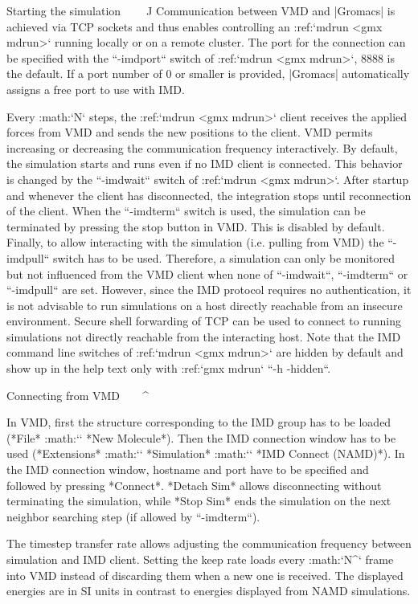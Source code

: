 Starting the simulation
^^^^^^^^^^^^^^^^^^^^^^^

Communication between VMD and |Gromacs| is achieved via TCP sockets and
thus enables controlling an :ref:`mdrun <gmx mdrun>` running locally or on
a remote cluster. The port for the connection can be specified with the
``-imdport`` switch of :ref:`mdrun <gmx mdrun>`, 8888 is the
default. If a port number of 0 or smaller is provided, |Gromacs|
automatically assigns a free port to use with IMD.

Every :math:`N` steps, the :ref:`mdrun <gmx mdrun>` client receives the
applied forces from VMD and sends the new positions to the client. VMD
permits increasing or decreasing the communication frequency
interactively. By default, the simulation starts and runs even if no IMD
client is connected. This behavior is changed by the
``-imdwait`` switch of :ref:`mdrun <gmx mdrun>`. After startup
and whenever the client has disconnected, the integration stops until
reconnection of the client. When the ``-imdterm`` switch is
used, the simulation can be terminated by pressing the stop button in
VMD. This is disabled by default. Finally, to allow interacting with the
simulation (i.e. pulling from VMD) the ``-imdpull`` switch
has to be used. Therefore, a simulation can only be monitored but not
influenced from the VMD client when none of ``-imdwait``,
``-imdterm`` or ``-imdpull`` are set. However,
since the IMD protocol requires no authentication, it is not advisable
to run simulations on a host directly reachable from an insecure
environment. Secure shell forwarding of TCP can be used to connect to
running simulations not directly reachable from the interacting host.
Note that the IMD command line switches of :ref:`mdrun <gmx mdrun>` are
hidden by default and show up in the help text only with
:ref:`gmx mdrun` ``-h -hidden``.

Connecting from VMD
^^^^^^^^^^^^^^^^^^^

In VMD, first the structure corresponding to the IMD group has to be
loaded (*File* :math:`\rightarrow` *New Molecule*). Then the IMD
connection window has to be used (*Extensions* :math:`\rightarrow`
*Simulation* :math:`\rightarrow` *IMD Connect (NAMD)*). In the IMD
connection window, hostname and port have to be specified and followed
by pressing *Connect*. *Detach Sim* allows disconnecting without
terminating the simulation, while *Stop Sim* ends the simulation on the
next neighbor searching step (if allowed by ``-imdterm``).

The timestep transfer rate allows adjusting the communication frequency
between simulation and IMD client. Setting the keep rate loads every
:math:`N^\mathrm{th}` frame into VMD instead of discarding them when a
new one is received. The displayed energies are in SI units in contrast
to energies displayed from NAMD simulations.

